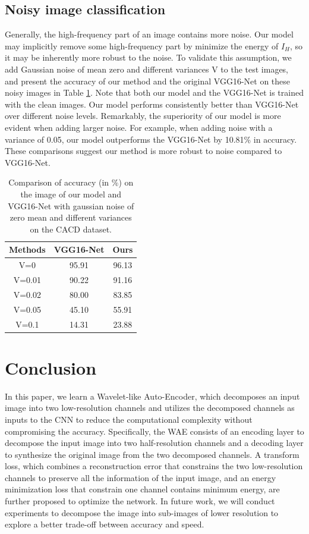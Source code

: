 \documentclass[letterpaper]{article} %
\begin{document}
\subsection{Noisy image classification}
Generally, the high-frequency part of an image contains more noise. Our model may implicitly remove some high-frequency part by minimize the energy of $I_H$, so it may be inherently more robust to the noise. To validate this assumption, we add Gaussian noise of mean zero and different variances V to the test images, and present the accuracy of our method and the original VGG16-Net on these noisy images in Table \ref{table:cacd_noise}. Note that both our model and the VGG16-Net is trained with the clean images. Our model performs consistently better than VGG16-Net over different noise levels. Remarkably, the superiority of our model is more evident when adding larger noise. For example, when adding noise with a variance of 0.05, our model outperforms the VGG16-Net by 10.81\% in accuracy. These comparisons suggest our method is more robust to noise compared to VGG16-Net.

\begin{table}[htbp]
\centering
\begin{tabular}{c|c|c}
\hline
Methods & VGG16-Net & Ours \\
\hline
V=0   & 95.91 & 96.13    \\
V=0.01   & 90.22  &  91.16     \\
V=0.02   & 80.00  &  83.85     \\
V=0.05   & 45.10  &  55.91     \\
V=0.1   & 14.31  &   23.88    \\
\hline
\end{tabular}
\caption{Comparison of accuracy (in \%) on the image of our model and VGG16-Net with gaussian noise of zero mean and different variances on the CACD dataset.}
\label{table:cacd_noise}
\end{table}


\section{Conclusion}
In this paper, we learn a Wavelet-like Auto-Encoder, which decomposes an input image into two low-resolution channels and utilizes the decomposed channels as inputs to the CNN to reduce the computational complexity without compromising the accuracy. Specifically, the WAE consists of an encoding layer to decompose the input image into two half-resolution channels and a decoding layer to synthesize the original image from the two decomposed channels. A transform loss, which combines a reconstruction error that constrains the two low-resolution channels to preserve all the information of the input image, and an energy minimization loss that constrain one channel contains minimum energy, are further proposed to optimize the network.
In future work, we will conduct experiments to decompose the image into sub-images of lower resolution to explore a better trade-off between accuracy and speed.
\end{document}
